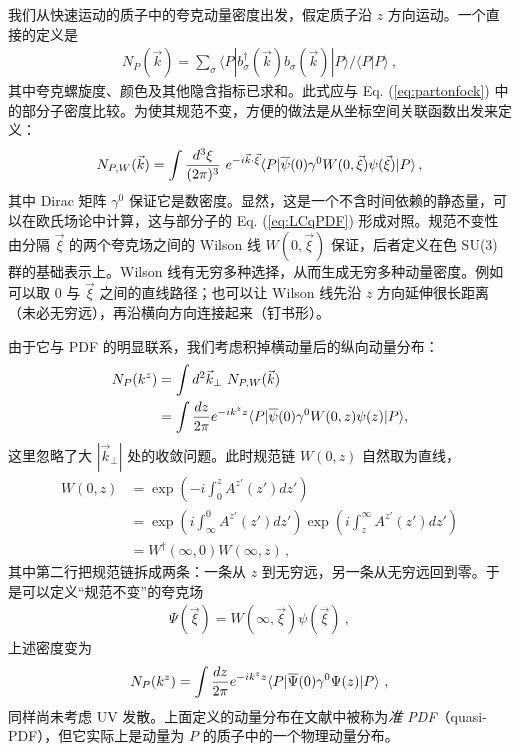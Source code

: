 我们从快速运动的质子中的夸克动量密度出发，假定质子沿 $z$ 方向运动。一个直接的定义是
\begin{align}
	N_P(\vec{k})=\sum_\sigma \langle P|b^\dagger_\sigma (\vec{k}) b_\sigma
	(\vec{k})|P\rangle/\langle P|P\rangle \ ,
\end{align}
其中夸克螺旋度、颜色及其他隐含指标已求和。此式应与 Eq. (\ref{eq:partonfock}) 中的部分子密度比较。为使其规范不变，方便的做法是从坐标空间关联函数出发来定义：
\begin{align}
	N_{P,W}(\vec{k})=\int {d^3\xi\over {(2\pi)^3}} \ e^{-i\vec{k}\cdot \vec{\xi}}
	\langle P|\overline{\psi}(0)\gamma^0W(0,\vec{\xi})\psi(\vec{\xi})|P\rangle\,,
\end{align}
其中 Dirac 矩阵 $\gamma^0$ 保证它是数密度。显然，这是一个不含时间依赖的静态量，可以在欧氏场论中计算，这与部分子的 Eq. (\ref{eq:LCqPDF}) 形成对照。规范不变性由分隔 $\vec{\xi}$ 的两个夸克场之间的 Wilson 线 $W(0,\vec{\xi})$ 保证，后者定义在色 SU(3) 群的基础表示上。Wilson 线有无穷多种选择，从而生成无穷多种动量密度。例如可以取 $0$ 与 $\vec{\xi}$ 之间的直线路径；也可以让 Wilson 线先沿 $z$ 方向延伸很长距离（未必无穷远），再沿横向方向连接起来（钉书形）。

由于它与 PDF 的明显联系，我们考虑积掉横动量后的纵向动量分布：
\begin{align}
	N_P(k^z)&=\int  d^2\vec{k}_\perp\ N_{P,W}(\vec{k}) \nonumber \\
	&=\int {dz\over{2\pi}} e^{-ik^z z} \langle P|\overline{\psi}(0)\gamma^0 W(0,z)\psi(z)|P\rangle,
	\label{eq:momdis1}
\end{align}
这里忽略了大 $|\vec{k}_\perp|$ 处的收敛问题。此时规范链 $W(0,z)$ 自然取为直线，
\begin{align}
	W(0,z) &= \exp(-i\int^z_0 A^{z'}(z') dz') \nonumber \\
	&= \exp(i\int^0_\infty A^{z'}(z') dz')\exp(i\int^\infty_z A^{z'}(z') dz')\nonumber \\
	&= W^\dagger(\infty,0) W(\infty,z)\,,
\end{align}
其中第二行把规范链拆成两条：一条从 $z$ 到无穷远，另一条从无穷远回到零。于是可以定义``规范不变''的夸克场
\begin{align}
	\Psi(\vec{\xi}) = W(\infty,\vec{\xi})\psi(\vec{\xi}) \ ,
\end{align}
上述密度变为
\begin{align}
	N_P(k^z)= \int {dz\over {2\pi}} e^{-ik^z z}  \langle P|\overline{\Psi}(0)\gamma^0\Psi(z)|P\rangle \ ,
	\label{eq:momdis}
\end{align}
同样尚未考虑 UV 发散。上面定义的动量分布在文献中被称为{\it 准 PDF}（quasi-PDF），但它实际上是动量为 $P$ 的质子中的一个物理动量分布。

